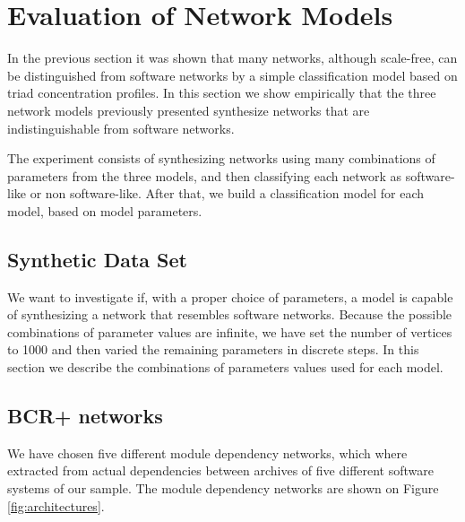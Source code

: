 
\section{Evaluation of Network Models}

In the previous section it was shown that many networks, although scale-free,
can be distinguished from software networks by a simple classification model
based on triad concentration profiles. In this section we show empirically that
the three network models previously presented synthesize networks that are
indistinguishable from software networks.

The experiment consists of synthesizing networks using many combinations of
parameters from the three models, and then classifying each network as
software-like or non software-like. After that, we build a classification model
for each model, based on model parameters.

\subsection{Synthetic Data Set}

We want to investigate if, with a proper choice of parameters, a model is
capable of synthesizing a network that resembles software networks. Because the
possible combinations of parameter values are infinite, we have set the number
of vertices to 1000 and then varied the remaining parameters in discrete steps.
In this section we describe the combinations of parameters values used for each
model.

\subsection{BCR+ networks}

We have chosen five different module dependency networks, which where extracted
from actual dependencies between archives of five different software systems of
our sample. The module dependency networks are shown on Figure
\ref{fig:architectures}. 

